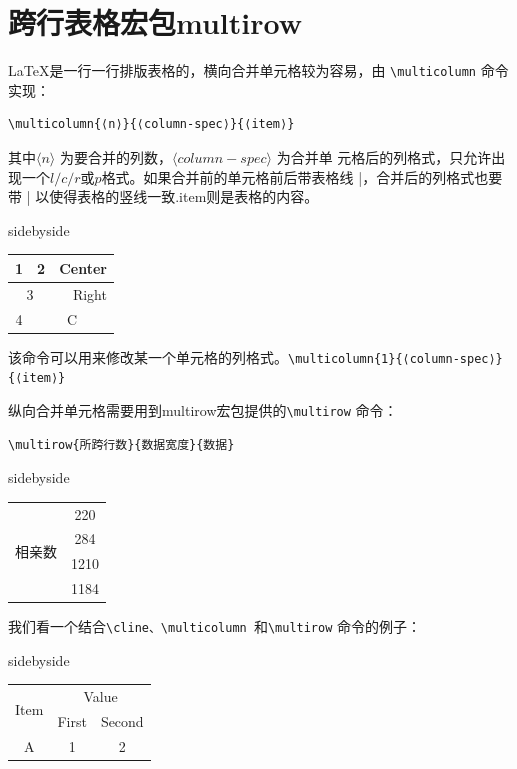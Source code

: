 \documentclass[cn,chinese,color=cyan]{elegantbook}
\begin{document}
\section{跨行表格宏包multirow}
\LaTeX 是一行一行排版表格的，横向合并单元格较为容易，由 \verb|\multicolumn| 命令实现：
\begin{lstlisting}[style=R]
\multicolumn{⟨n⟩}{⟨column-spec⟩}{⟨item⟩}
\end{lstlisting}
其中$ ⟨n⟩$ 为要合并的列数，$⟨column-spec⟩$ 为合并单
元格后的列格式，只允许出现一个$ l/c/r $或$p $格式。如果合并前的单元格前后带表格线 |，合并后的列格式也要带 | 以使得表格的竖线一致.item则是表格的内容。
\begin{tcblisting}{sidebyside}
\begin{tabular}{|c|c|c|}
\hline
1 & 2 & Center \\ \hline
\multicolumn{2}{|c|}{3} &
\multicolumn{1}{r|}{Right} \\ \hline
4 & \multicolumn{2}{c|}{C} \\ \hline
\end{tabular}
\end{tcblisting}
\begin{note}
	该命令可以用来修改某一个单元格的列格式。\verb|\multicolumn{1}{⟨column-spec⟩}{⟨item⟩}|
\end{note}

纵向合并单元格需要用到multirow宏包提供的\verb|\multirow| 命令：
\begin{lstlisting}[style=R]
\multirow{所跨行数}{数据宽度}{数据}
\end{lstlisting}
\begin{tcblisting}{sidebyside}
\begin{tabular}{|c|c|}
\hline
\multirow{4}{*}{相亲数}
& 220 \\ \cline{2-2}
& 284 \\ \cline{2-2}
&1210 \\ \cline{2-2}
&1184 \\ \hline 
\end{tabular}
\end{tcblisting}
我们看一个结合\verb|\cline、\multicolumn |和\verb|\multirow| 命令的例子：
\begin{tcblisting}{sidebyside}
\begin{tabular}{ccc}
\hline
\multirow{2}{*}{Item} &
\multicolumn{2}{c}{Value} \\
\cline{2-3}
& First & Second \\ \hline
A & 1 & 2 \\ \hline
\end{tabular}
\end{tcblisting}
\end{document}
